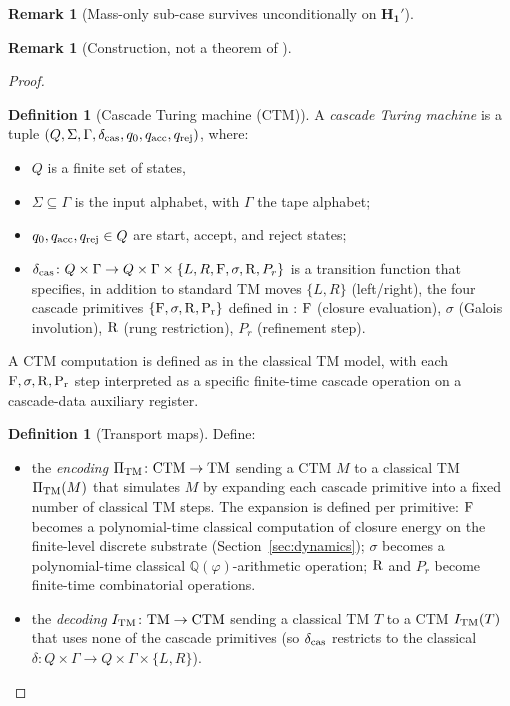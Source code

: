 \documentclass[11pt, a4paper]{amsart}
\theoremstyle{definition}
\newtheorem{definition}[theorem]{Definition}
\newtheorem{remark}[theorem]{Remark}
\newcommand{\Q}{\mathbb{Q}}
\newcommand{\pphi}{\varphi}
\newcommand{\TM}{{\rm TM}}
\begin{document}
\begin{remark}[Mass-only sub-case survives unconditionally on $\mathbf{H_1'}$]
\begin{remark}[Construction, not a theorem of \cite{CascadeEmbeddings}]
\begin{proof}
\begin{definition}[Cascade Turing machine (CTM)]
\label{def:ctm}
A \emph{cascade Turing machine} is a tuple $(Q, \Sigma, \Gamma,
\delta_{\rm cas}, q_0, q_{\rm acc}, q_{\rm rej})$, where:
\begin{itemize}
\item $Q$ is a finite set of states,
\item $\Sigma \subseteq \Gamma$ is the input alphabet, with
  $\Gamma$ the tape alphabet;
\item $q_0, q_{\rm acc}, q_{\rm rej} \in Q$ are start, accept, and
  reject states;
\item $\delta_{\rm cas} \colon Q \times \Gamma \to Q \times \Gamma
  \times \{L, R, {\rm F}, \sigma, {\rm R}, P_r\}$ is a transition
  function that specifies, in addition to standard TM moves
  $\{L, R\}$ (left/right), the four cascade primitives
  $\{\rm F, \sigma, R, P_r\}$ defined in \cite[\S D1]{CascadeDynamics}:
  $\rm F$ (closure evaluation), $\sigma$ (Galois involution),
  $\rm R$ (rung restriction), $P_r$ (refinement step).
\end{itemize}
A CTM computation is defined as in the classical TM model, with
each $\rm F, \sigma, R, P_r$ step interpreted as a specific
finite-time cascade operation on a cascade-data auxiliary
register.
\end{definition}

\begin{definition}[Transport maps]
\label{def:ctm-transport}
Define:
\begin{itemize}
\item the \emph{encoding} $\Pi_{\TM} \colon {\rm CTM} \to {\rm TM}$
  sending a CTM $M$ to a classical TM
  $\Pi_{\TM}(M)$ that simulates $M$ by expanding each cascade
  primitive into a fixed number of classical TM steps.
  The expansion is defined per primitive: $\rm F$ becomes a
  polynomial-time classical computation of closure energy on the
  finite-level discrete substrate (Section~\ref{sec:dynamics});
  $\sigma$ becomes a polynomial-time classical $\Q(\pphi)$-arithmetic
  operation; $\rm R$ and $P_r$ become finite-time combinatorial
  operations.
\item the \emph{decoding} $I_{\TM} \colon {\rm TM} \to {\rm CTM}$
  sending a classical TM $T$ to a CTM
  $I_{\TM}(T)$ that uses none of the cascade primitives (so
  $\delta_{\rm cas}$ restricts to the classical
  $\delta \colon Q \times \Gamma \to Q \times \Gamma \times
  \{L, R\}$).
\end{itemize}
\end{definition}


\end{proof}
\end{remark}
\end{remark}
\end{document}
